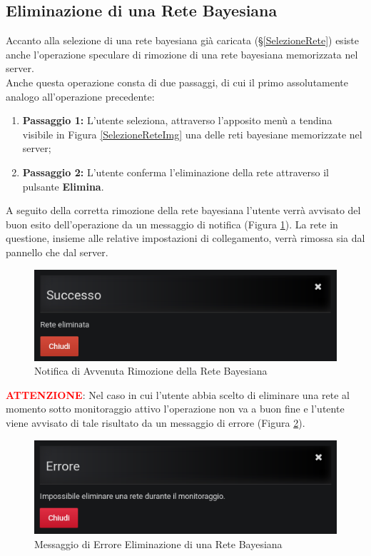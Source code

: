 \subsection{Eliminazione di una Rete Bayesiana}\label{EliminazioneRete}

Accanto alla selezione di una rete bayesiana già caricata (§\ref{SelezioneRete}) esiste anche l'operazione speculare di rimozione di una rete bayesiana memorizzata nel server.\\
Anche questa operazione consta di due passaggi, di cui il primo assolutamente analogo all'operazione precedente:
\begin{enumerate}
	\item \textbf{Passaggio 1:} L'utente seleziona, attraverso l'apposito menù a tendina visibile in Figura \ref{SelezioneReteImg} una delle reti bayesiane memorizzate nel server;
	\item \textbf{Passaggio 2:} L'utente conferma l'eliminazione della rete attraverso il pulsante \textbf{Elimina}.
\end{enumerate}

A seguito della corretta rimozione della rete bayesiana l'utente verrà avvisato del buon esito dell'operazione da un messaggio di notifica (Figura \ref{NotificaRimozioneRete}). La rete in questione, insieme alle relative impostazioni di collegamento, verrà rimossa sia dal pannello che dal server.

\begin{figure}[H]
	\begin{center}
		\includegraphics[scale=0.6]{./images/NotificaRimozioneRete.png}
		 \caption{Notifica di Avvenuta Rimozione della Rete Bayesiana}	
		 \label{NotificaRimozioneRete}
	\end{center}
\end{figure}

\textbf{\textcolor{red}{ATTENZIONE}}: Nel caso in cui l'utente abbia scelto di eliminare una rete al momento sotto monitoraggio attivo l'operazione non va a buon fine e l'utente viene avvisato di tale risultato da un messaggio di errore (Figura \ref{ErroreDeleteNet}).

\begin{figure}[H]
	\begin{center}
		\includegraphics[scale=0.6]{./images/ErroreDeleteNet.png}
		 \caption{Messaggio di Errore Eliminazione di una Rete Bayesiana}	
		 \label{ErroreDeleteNet}
	\end{center}
\end{figure}
